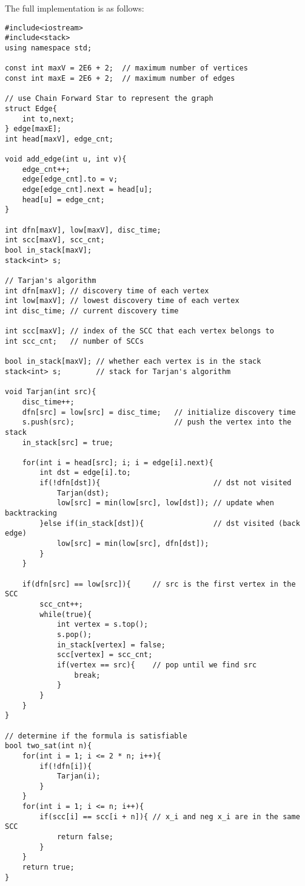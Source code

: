 \documentclass[a4paper,12pt]{article}
\begin{document}
The full implementation is as follows:
\begin{verbatim}
#include<iostream>
#include<stack>
using namespace std;

const int maxV = 2E6 + 2;  // maximum number of vertices
const int maxE = 2E6 + 2;  // maximum number of edges

// use Chain Forward Star to represent the graph
struct Edge{
    int to,next;
} edge[maxE];
int head[maxV], edge_cnt;

void add_edge(int u, int v){
    edge_cnt++;
    edge[edge_cnt].to = v;
    edge[edge_cnt].next = head[u];
    head[u] = edge_cnt;
}

int dfn[maxV], low[maxV], disc_time;
int scc[maxV], scc_cnt;
bool in_stack[maxV];
stack<int> s;

// Tarjan's algorithm
int dfn[maxV]; // discovery time of each vertex
int low[maxV]; // lowest discovery time of each vertex
int disc_time; // current discovery time

int scc[maxV]; // index of the SCC that each vertex belongs to
int scc_cnt;   // number of SCCs

bool in_stack[maxV]; // whether each vertex is in the stack
stack<int> s;        // stack for Tarjan's algorithm

void Tarjan(int src){
    disc_time++;
    dfn[src] = low[src] = disc_time;   // initialize discovery time
    s.push(src);                       // push the vertex into the stack
    in_stack[src] = true; 

    for(int i = head[src]; i; i = edge[i].next){
        int dst = edge[i].to;
        if(!dfn[dst]){                          // dst not visited
            Tarjan(dst);
            low[src] = min(low[src], low[dst]); // update when backtracking
        }else if(in_stack[dst]){                // dst visited (back edge)
            low[src] = min(low[src], dfn[dst]); 
        }
    }

    if(dfn[src] == low[src]){     // src is the first vertex in the SCC
        scc_cnt++;
        while(true){
            int vertex = s.top();
            s.pop();
            in_stack[vertex] = false;
            scc[vertex] = scc_cnt;
            if(vertex == src){    // pop until we find src
                break;
            }
        }
    }
}

// determine if the formula is satisfiable
bool two_sat(int n){
    for(int i = 1; i <= 2 * n; i++){
        if(!dfn[i]){
            Tarjan(i);
        }
    }
    for(int i = 1; i <= n; i++){
        if(scc[i] == scc[i + n]){ // x_i and neg x_i are in the same SCC
            return false;
        }
    }
    return true;
}


\end{verbatim}
\end{document}
